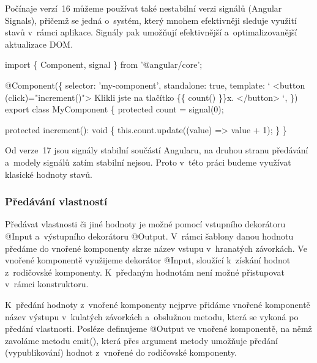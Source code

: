 Počínaje verzí~16 můžeme používat také nestabilní verzi signálů (Angular Signals), přičemž se jedná o~systém, který mnohem efektivněji sleduje využití stavů v~rámci aplikace. 
Signály pak umožňují efektivnější a~optimalizovanější aktualizace DOM. 

\begin{prog}
import \{ Component, signal \} from '@angular/core';

@Component(\{
  selector: 'my-component',
  standalone: true,
  template: `
    <button (click)="increment()">
      Klikli jste na tlačítko \{\{ count() \}\}x.
    </button>
  `,
\})
export class MyComponent \{
  protected count = signal(0);

  protected increment(): void \{
    this.count.update((value) => value + 1);
  \}
\}
\end{prog}

Od verze~17 jsou signály stabilní součástí Angularu, na druhou stranu předávání a~modely signálů zatím stabilní nejsou. 
Proto v~této práci budeme využívat klasické hodnoty stavů.\cite{angulardev}

\subsubsection{Předávání vlastností}

Předávat vlastnosti či jiné hodnoty je možné pomocí vstupního dekorátoru @Input a~výstupního dekorátoru @Output. 
V~rámci šablony danou hodnotu předáme do vnořené komponenty skrze název vstupu v~hranatých závorkách.   
Ve vnořené komponentě využijeme dekorátor @Input, sloužící k~získání hodnot z~rodičovské komponenty. K~předaným hodnotám není možné přistupovat v~rámci konstruktoru. 

K~předání hodnoty z~vnořené komponenty nejprve přidáme vnořené komponentě název výstupu v~kulatých závorkách a~obslužnou metodu, která se vykoná po předání vlastnosti. 
Posléze definujeme @Output ve vnořené komponentě, na němž zavoláme metodu emit(), která přes argument metody umožňuje předání (vypublikování) hodnot z~vnořené do rodičovské komponenty.\cite{angulardev,learningangular}

